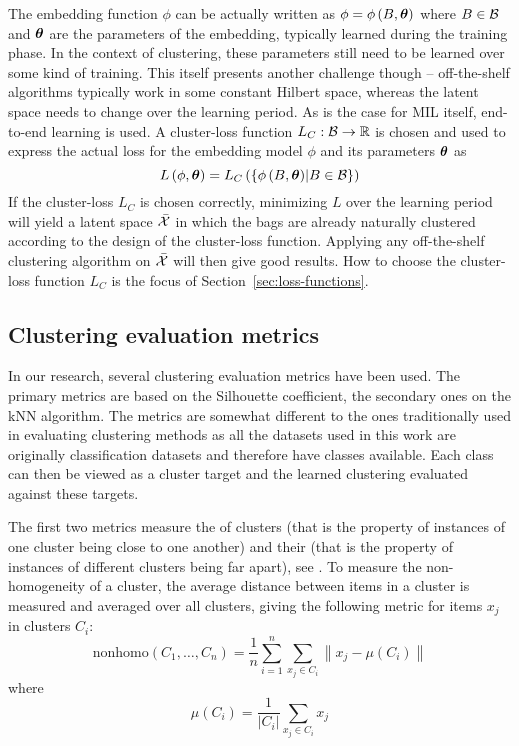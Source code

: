 The embedding function \( \phi \) can be actually written as \( \phi = \phi \left( B, \bm{\theta} \right) \) where \( B \in \mathcal{B} \) and \( \bm{\theta} \) are the parameters of the embedding, typically learned during the training phase. In the context of clustering, these parameters still need to be learned over some kind of training. This itself presents another challenge though -- off-the-shelf algorithms typically work in some constant Hilbert space, whereas the latent space needs to change over the learning period. As is the case for MIL itself, end-to-end learning is used. A cluster-loss function \( L_C: \mathcal{B} \to \mathbb{R} \) is chosen and used to express the actual loss for the embedding model \( \phi \) and its parameters \( \bm{\theta} \) as
\[ L \left( \phi, \bm{\theta} \right) = L_C \left( \left\{ \phi \left( B, \bm{\theta} \right) \middle| B \in \mathcal{B} \right\} \right) \]
If the cluster-loss \( L_C \) is chosen correctly, minimizing \( L \) over the learning period will yield a latent space \( \bar{\mathcal{X}} \) in which the bags are already naturally clustered according to the design of the cluster-loss function. Applying any off-the-shelf clustering algorithm on \( \bar{\mathcal{X}} \) will then give good results. How to choose the cluster-loss function \( L_C \) is the focus of Section~\ref{sec:loss-functions}.

\subsection{Clustering evaluation metrics}\label{sec:clustering-metrics}
In our research, several clustering evaluation metrics have been used. The primary metrics are based on the Silhouette coefficient, the secondary ones on the kNN algorithm. The metrics are somewhat different to the ones traditionally used in evaluating clustering methods as all the datasets used in this work are originally classification datasets and therefore have classes available. Each class can then be viewed as a cluster target and the learned clustering evaluated against these targets.

The first two metrics measure the  of clusters (that is the property of instances of one cluster being close to one another) and their  (that is the property of instances of different clusters being far apart), see \cite{everitt_cluster_2001}. To measure the non-homogeneity of a cluster, the average distance between items in a cluster is measured and averaged over all clusters, giving the following metric for items \( x_j \) in clusters \( C_i \):
\[ \mathrm{nonhomo} \left( C_1, \dots, C_n \right) = \frac{1}{n} \sum_{i = 1}^n \sum_{x_j \in C_i} \left\lVert x_j - \mu \left( C_i \right) \right\rVert \]
where
\[ \mu \left( C_i \right) = \frac{1}{\left\lvert C_i \right\rvert} \sum_{x_j \in C_i} x_j \]

